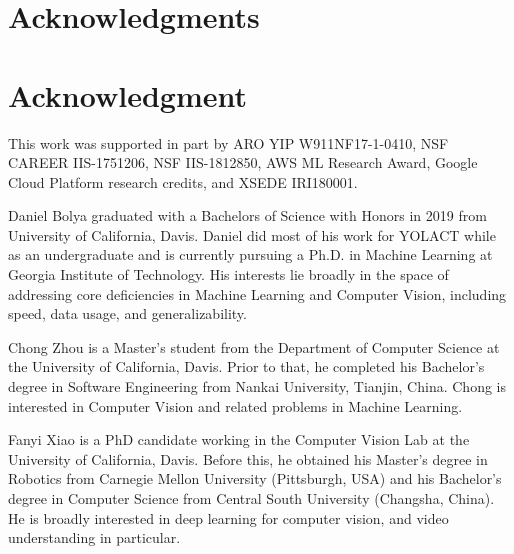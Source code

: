 \documentclass[10pt,journal,compsoc]{IEEEtran}
\begin{document}
\ifCLASSOPTIONcompsoc
\section*{Acknowledgments}
\else
\section*{Acknowledgment}
\fi

This work was supported in part by ARO YIP W911NF17-1-0410, NSF CAREER IIS-1751206, NSF IIS-1812850, AWS ML Research Award, Google Cloud Platform research credits, and XSEDE IRI180001. 


\ifCLASSOPTIONcaptionsoff
  \newpage
\fi

{
    
    
}

\newpage
\vspace{-30pt}
\begin{IEEEbiography}{Daniel Bolya}
graduated with a Bachelors of Science with Honors in 2019 from University of California, Davis. Daniel did most of his work for YOLACT while as an undergraduate and is currently pursuing a Ph.D. in Machine Learning at Georgia Institute of Technology. His interests lie broadly in the space of addressing core deficiencies in Machine Learning and Computer Vision, including speed, data usage, and generalizability.
\end{IEEEbiography}

\vspace{-20pt}
\begin{IEEEbiography}{Chong Zhou}
is a Master's student from the Department of Computer Science at the University of California, Davis. Prior to that, he completed his Bachelor's degree in Software Engineering from Nankai University, Tianjin, China. Chong is interested in Computer Vision and related problems in Machine Learning.
\end{IEEEbiography}

\vspace{-20pt}
\begin{IEEEbiography}{Fanyi Xiao}
is a PhD candidate working in the Computer Vision Lab at the University of California, Davis. Before this, he obtained his Master's degree in Robotics from Carnegie Mellon University (Pittsburgh, USA) and his Bachelor's degree in Computer Science from Central South University (Changsha, China). He is broadly interested in deep learning for computer vision, and video understanding in particular. 
\end{IEEEbiography}
\end{document}

